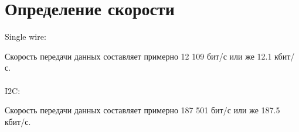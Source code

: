 \documentclass{article}
\begin{document}
\section{Определение скорости }
Single wire: 

Скорость передачи данных составляет примерно 12 109 бит/с или же 12.1 кбит/с.
\\ \\
I2C: 

Скорость передачи данных составляет примерно 187 501 бит/с или же  187.5 кбит/с.
\end{document}
